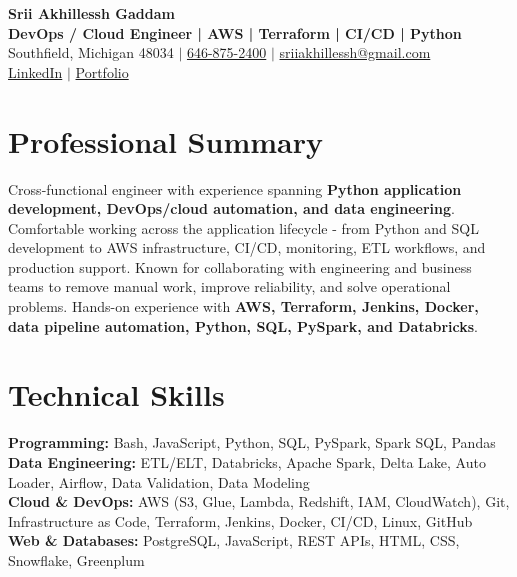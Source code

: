 \documentclass[letterpaper,10pt]{article}
\begin{document}
\fontsize{9.35pt}{10.45pt}\selectfont

\begin{center}
    {\LARGE \textbf{Srii Akhillessh Gaddam}} \\[-1pt]
    \textbf{DevOps / Cloud Engineer | AWS | Terraform | CI/CD | Python} \\[2pt]
    Southfield, Michigan 48034 $|$
    \href{tel:6468752400}{646-875-2400} $|$
    \href{mailto:sriiakhillessh@gmail.com}{sriiakhillessh@gmail.com} \\[1pt]
    \href{https://www.linkedin.com/in/srii-akhiilessh-gaddam-b48668191/}{LinkedIn} $|$
    \href{https://sriiakhillesshg.github.io/portfolio/}{Portfolio}
\end{center}
\vspace{-8pt}

\section{Professional Summary}
\small{Cross-functional engineer with experience spanning \textbf{Python application development, DevOps/cloud automation, and data engineering}. Comfortable working across the application lifecycle - from Python and SQL development to AWS infrastructure, CI/CD, monitoring, ETL workflows, and production support. Known for collaborating with engineering and business teams to remove manual work, improve reliability, and solve operational problems. Hands-on experience with \textbf{AWS, Terraform, Jenkins, Docker, data pipeline automation, Python, SQL, PySpark, and Databricks}.}

\section{Technical Skills}
\small{
\textbf{Programming:} Bash, JavaScript, Python, SQL, PySpark, Spark SQL, Pandas \\
\textbf{Data Engineering:} ETL/ELT, Databricks, Apache Spark, Delta Lake, Auto Loader, Airflow, Data Validation, Data Modeling \\
\textbf{Cloud \& DevOps:} AWS (S3, Glue, Lambda, Redshift, IAM, CloudWatch), Git, Infrastructure as Code, Terraform, Jenkins, Docker, CI/CD, Linux, GitHub \\
\textbf{Web \& Databases:} PostgreSQL, JavaScript, REST APIs, HTML, CSS, Snowflake, Greenplum
}
\end{document}
